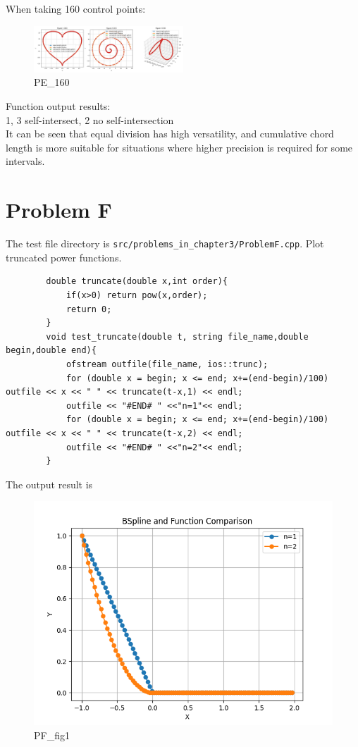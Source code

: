 \documentclass[a4paper]{article}
\begin{document}
    When taking 160 control points:
    \begin{figure}[H] 
        \centering
        \includegraphics[width=0.5\textwidth]{../figure/PE_160.png} 
        \caption{PE\_160} 
    \end{figure}
    Function output results:\\
    1, 3 self-intersect, 2 no self-intersection\\
    It can be seen that equal division has high versatility, and cumulative chord length is more suitable for situations where higher precision is required for some intervals.
    
\section*{Problem F}
    The test file directory is \texttt{src/problems\_in\_chapter3/ProblemF.cpp}.
    Plot truncated power functions.
    \begin{verbatim}
        double truncate(double x,int order){
            if(x>0) return pow(x,order);
            return 0;
        }
        void test_truncate(double t, string file_name,double begin,double end){
            ofstream outfile(file_name, ios::trunc);
            for (double x = begin; x <= end; x+=(end-begin)/100) outfile << x << " " << truncate(t-x,1) << endl;
            outfile << "#END# " <<"n=1"<< endl;
            for (double x = begin; x <= end; x+=(end-begin)/100) outfile << x << " " << truncate(t-x,2) << endl;
            outfile << "#END# " <<"n=2"<< endl;
        }
    \end{verbatim}
    The output result is
    \begin{figure}[H] 
        \centering
        \includegraphics{../figure/PF_fig1.png}
    \caption{PF\_fig1} 
    \end{figure}
\end{document}
